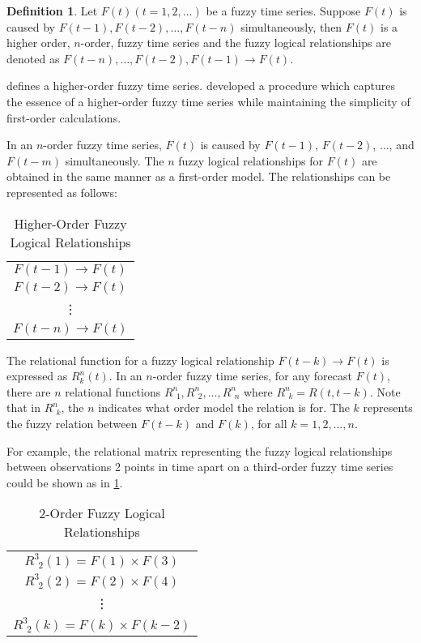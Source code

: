 \documentclass[12pt, oneside, a4paper]{article}
\theoremstyle{definition}
\newtheorem{ftsdef}{Definition}
\begin{document}
\begin{ftsdef}
\label{def5}
Let $F(t)(t=1,2,\ldots)$ be a fuzzy time series. Suppose $F(t)$ is caused by $F(t-1),F(t-2),\ldots,F(t-n)$ simultaneously, then $F(t)$ is a higher order, $n$-order, fuzzy time series and the fuzzy logical relationships are denoted as $F(t-n), \ldots, F(t-2), F(t-1) \rightarrow F(t)$.
\end{ftsdef}

 defines a higher-order fuzzy time series. \cite{tsai1999study} developed a procedure which captures the essence of a higher-order fuzzy time series while maintaining the simplicity of first-order calculations.

In an $n$-order fuzzy time series, $F(t)$ is caused by $F(t-1)$, $F(t-2)$, $\ldots$, and $F(t-m)$ simultaneously. The $n$ fuzzy logical relationships for $F(t)$ are obtained in the same manner as a first-order model. The relationships can be represented as follows:

\begin{table}[H]
	\center
	\begin{tabular}{ c }
	\hline
  	$F(t-1) \rightarrow F(t)$ \\
  	$F(t-2) \rightarrow F(t)$ \\
  	\vdots \\
  	$F(t-n) \rightarrow F(t)$ \\
  	\hline
	\end{tabular}
	\caption{Higher-Order Fuzzy Logical Relationships}
\end{table}

The relational function for a fuzzy logical relationship $F(t-k) \rightarrow F(t)$ is expressed as $R^{n}_{k}(t)$. In an $n$-order fuzzy time series, for any forecast $F(t)$, there are $n$ relational functions $R^{n}_{\ \ 1}, R^{n}_{\ \ 2}, \ldots, R^{n}_{\ \ n}$ where $R^{n}_{\ \ k}=R(t,t-k)$. Note that in $R^{n}_{\ \ k}$, the $n$ indicates what order model the relation is for. The $k$ represents the fuzzy relation between $F(t-k)$ and $F(k)$, for all $k={1,2,\ldots,n}$. 

For example, the relational matrix representing the fuzzy logical relationships between observations 2 points in time apart on a third-order fuzzy time series could be shown as in \cref{2-order-rels}.

\begin{table}[H]
	\center
	\begin{tabular}{ c }
	\hline
  	$R^{3}_{\ \ 2}(1) = F(1) \times F(3)$ \\
  	$R^{3}_{\ \ 2}(2) = F(2) \times F(4)$ \\
  	\vdots \\
  	$R^{3}_{\ \ 2}(k) = F(k) \times F(k-2)$ \\
  	\hline
	\end{tabular}
	\caption{2-Order Fuzzy Logical Relationships}
	\label{2-order-rels}
\end{table}
\end{document}
